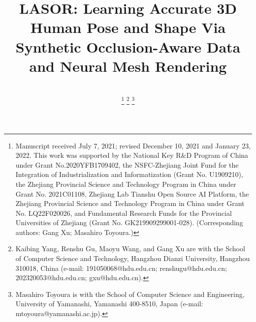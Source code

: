\documentclass[journal]{IEEEtran}
\begin{document}
\title{LASOR: Learning Accurate 3D Human Pose and Shape Via Synthetic Occlusion-Aware Data and Neural Mesh Rendering}
\author{\\
\thanks{Manuscript received July 7, 2021; revised December 10, 2021 and January 23, 2022. This work was supported by the National Key R\&D Program of China under Grant No.2020YFB1709402, the NSFC-Zhejiang Joint Fund for the Integration of Industrialization and Informatization (Grant No. U1909210), the Zhejiang Provincial Science and Technology Program in China under Grant No. 2021C01108, Zhejiang Lab Tianshu Open Source AI Platform, the Zhejiang Provincial Science and Technology Program in China under Grant No. LQ22F020026, and Fundamental Research Funds for the Provincial Universities of Zhejiang (Grant No. GK219909299001-028). (Corresponding authors: Gang Xu; Masahiro Toyoura.)}
\thanks{Kaibing Yang, Renshu Gu, Maoyu Wang, and Gang Xu are with the School of Computer Science and Technology, Hangzhou Dianzi University, Hangzhou 310018, China (e-mail: 191050068@hdu.edu.cn; renshugu@hdu.edu.cn; 202320053@hdu.edu.cn; gxu@hdu.edu.cn).}
\thanks{Masahiro Toyoura is with the School of Computer Science and Engineering, University of Yamanashi, Yamanashi 400-8510, Japan (e-mail: mtoyoura@yamanashi.ac.jp).}}





















\maketitle
\end{document}
